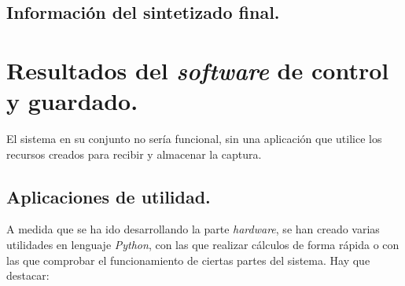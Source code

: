 \subsection{Información del sintetizado final.}




\section{Resultados del \emph{software} de control y guardado.}
 El sistema en su conjunto no sería funcional, sin una aplicación que utilice los recursos creados para recibir y almacenar la captura.



\subsection{Aplicaciones de utilidad.}
A medida que se ha ido desarrollando la parte \emph{hardware}, se han creado varias utilidades en lenguaje \emph{Python}, con las que realizar cálculos de forma rápida o con las que comprobar el funcionamiento de ciertas partes del sistema. Hay que destacar:
